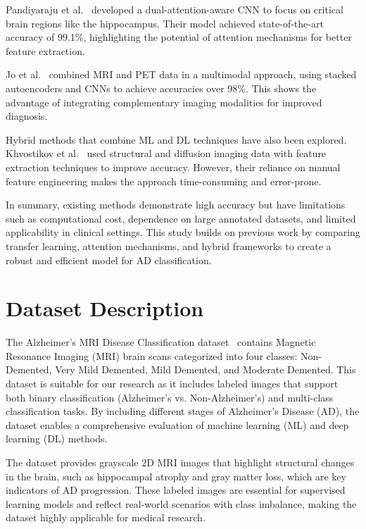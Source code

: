 \documentclass[runningheads]{llncs}
\begin{document}
Pandiyaraju et al.~\cite{pandiyaraju2022} developed a dual-attention-aware CNN to focus on critical brain regions like the hippocampus. Their model achieved state-of-the-art accuracy of 99.1\%, highlighting the potential of attention mechanisms for better feature extraction.

Jo et al.~\cite{jo2021} combined MRI and PET data in a multimodal approach, using stacked autoencoders and CNNs to achieve accuracies over 98\%. This shows the advantage of integrating complementary imaging modalities for improved diagnosis.

Hybrid methods that combine ML and DL techniques have also been explored. Khvostikov et al.~\cite{khvostikov2022} used structural and diffusion imaging data with feature extraction techniques to improve accuracy. However, their reliance on manual feature engineering makes the approach time-consuming and error-prone.

In summary, existing methods demonstrate high accuracy but have limitations such as computational cost, dependence on large annotated datasets, and limited applicability in clinical settings. This study builds on previous work by comparing transfer learning, attention mechanisms, and hybrid frameworks to create a robust and efficient model for AD classification.

\section{Dataset Description}

The Alzheimer's MRI Disease Classification dataset~\cite{dataset_source} contains Magnetic Resonance Imaging (MRI) brain scans categorized into four classes: Non-Demented, Very Mild Demented, Mild Demented, and Moderate Demented. This dataset is suitable for our research as it includes labeled images that support both binary classification (Alzheimer's vs. Non-Alzheimer's) and multi-class classification tasks. By including different stages of Alzheimer's Disease (AD), the dataset enables a comprehensive evaluation of machine learning (ML) and deep learning (DL) methods.

The dataset provides grayscale 2D MRI images that highlight structural changes in the brain, such as hippocampal atrophy and gray matter loss, which are key indicators of AD progression. These labeled images are essential for supervised learning models and reflect real-world scenarios with class imbalance, making the dataset highly applicable for medical research.
\end{document}
